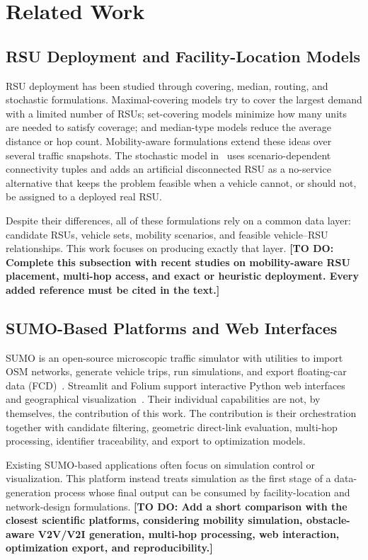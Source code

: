 \documentclass[engproc,proceedingpaper,submit,oneauthor]{Definitions/mdpi}
\DeclareRobustCommand{\todo}[1]{{\color{todored}\textbf{[TO DO: #1]}}}
\begin{document}
\section{Related Work}\label{sec:related}

\subsection{RSU Deployment and Facility-Location Models}
RSU deployment has been studied through covering, median, routing, and stochastic
formulations. Maximal-covering models try to cover the largest demand with a limited
number of RSUs; set-covering models minimize how many units are needed to satisfy
coverage; and median-type models reduce the average distance or hop count.
Mobility-aware formulations extend these ideas over several traffic snapshots. The
stochastic model in~\citep{ref-urquiza} uses scenario-dependent connectivity tuples
and adds an artificial disconnected RSU as a no-service alternative that keeps the
problem feasible when a vehicle cannot, or should not, be assigned to a deployed real
RSU.

Despite their differences, all of these formulations rely on a common data layer:
candidate RSUs, vehicle sets, mobility scenarios, and feasible vehicle--RSU
relationships. This work focuses on producing exactly that layer. \todo{Complete
this subsection with recent studies on mobility-aware RSU placement, multi-hop
access, and exact or heuristic deployment. Every added reference must be cited in the
text.}

\subsection{SUMO-Based Platforms and Web Interfaces}
SUMO is an open-source microscopic traffic simulator with utilities to import OSM
networks, generate vehicle trips, run simulations, and export floating-car data
(FCD)~\citep{ref-sumo,ref-osm}. Streamlit and Folium support interactive Python web
interfaces and geographical visualization~\citep{ref-streamlit,ref-folium}. Their
individual capabilities are not, by themselves, the contribution of this work. The
contribution is their orchestration together with candidate filtering, geometric
direct-link evaluation, multi-hop processing, identifier traceability, and export to
optimization models.

Existing SUMO-based applications often focus on simulation control or visualization.
This platform instead treats simulation as the first stage of a data-generation
process whose final output can be consumed by facility-location and network-design
formulations. \todo{Add a short comparison with the closest scientific platforms,
considering mobility simulation, obstacle-aware V2V/V2I generation, multi-hop
processing, web interaction, optimization export, and reproducibility.}
\end{document}
